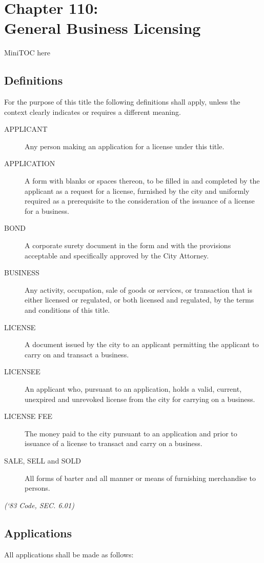 %
\chapter*{Chapter 110: \\
	General Business Licensing}

MiniTOC here
\pagebreak

\section{Definitions}
For the purpose of this title the following definitions shall apply, unless the context clearly indicates or requires a different meaning.
\begin{description}
    \item[APPLICANT]  Any person making an application for a license under this title.
    \item[APPLICATION]  A form with blanks or spaces thereon, to be filled in and completed by the applicant as a request for a license, furnished by the city and uniformly required as a prerequisite to the consideration of the issuance of a license for a business.
    \item[BOND]  A corporate surety document in the form and with the provisions acceptable and specifically approved by the City Attorney.
    \item[BUSINESS]  Any activity, occupation, sale of goods or services, or transaction that is either licensed or regulated, or both licensed and regulated, by the terms and conditions of this title.
    \item[LICENSE]  A document issued by the city to an applicant permitting the applicant to carry on and transact a business.
    \item[LICENSEE]  An applicant who, pursuant to an application, holds a valid, current, unexpired and unrevoked license from the city for carrying on a business.
    \item[LICENSE FEE]  The money paid to the city pursuant to an application and prior to issuance of a license to transact and carry on a business.
    \item[SALE, SELL and SOLD]  All forms of barter and all manner or means of furnishing merchandise to persons.
\end{description}
\emph{(‘83 Code, SEC. 6.01)}

\section{Applications}
All applications shall be made as follows:
